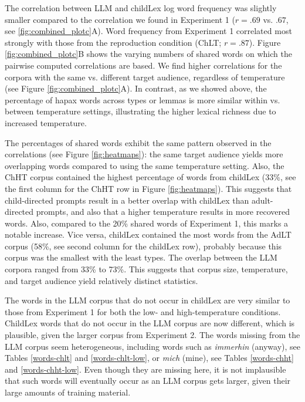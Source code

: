 \documentclass[doc, a4paper, anonymous]{apa7}
\begin{document}
The correlation between LLM and childLex log word frequency was slightly smaller compared to the correlation we found in Experiment 1 ($r=.69$ vs. $.67$, see \ref{fig:combined_plotc}A). Word frequency from Experiment 1 correlated most strongly with those from the reproduction condition (ChLT; $r=.87$). Figure \ref{fig:combined_plotc}B shows the varying numbers of shared words on which the pairwise computed correlations are based. We find higher correlations for the corpora with the same vs. different target audience, regardless of temperature (see Figure \ref{fig:combined_plotc}A). In contrast, as we showed above, the percentage of hapax words across types or lemmas is more similar within vs. between temperature settings, illustrating the higher lexical richness due to increased temperature. 

The percentages of shared words exhibit the same pattern observed in the correlations (see Figure \ref{fig:heatmaps}): the same target audience yields more overlapping words compared to using the same temperature setting. Also, the ChHT corpus contained the highest percentage of words from childLex (33\%, see the first column for the ChHT row in Figure \ref{fig:heatmaps}). This suggests that child-directed prompts result in a better overlap with childLex than adult-directed prompts, and also that a higher temperature results in more recovered words. Also, compared to the 20\% shared words of Experiment 1, this marks a notable increase. Vice versa, childLex contained the most words from the AdLT corpus (58\%, see second column for the childLex row), probably because this corpus was the smallest with the least types. The overlap between the LLM corpora ranged from 33\% to 73\%. This suggests that corpus size, temperature, and target audience yield relatively distinct statistics.  

The words in the LLM corpus that do not occur in childLex are very similar to those from Experiment 1 for both the low- and high-temperature conditions. ChildLex words that do not occur in the LLM corpus are now different, which is plausible, given the larger corpus from Experiment 2. The words missing from the LLM corpus seem heterogeneous, including words such as \textit{immerhin} (anyway), see Tables \ref{words-chlt} and \ref{words-chlt-low}, or \textit{mich} (mine), see Tables \ref{words-chht} and \ref{words-chht-low}. Even though they are missing here, it is not implausible that such words will eventually occur as an LLM corpus gets larger, given their large amounts of training material. 
\end{document}

